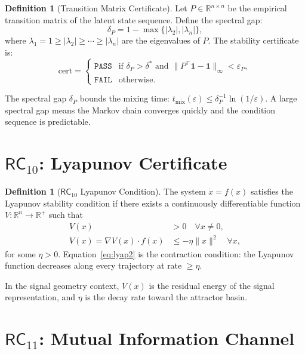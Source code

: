 \documentclass[11pt,twoside]{article}
\theoremstyle{plain}
\theoremstyle{definition}
\newtheorem{definition}[theorem]{Definition}
\theoremstyle{remark}
\newcommand{\RC}[1]{\textsf{RC}_{#1}}
\begin{document}
\begin{definition}[Transition Matrix Certificate]
Let $P\in\mathbb{R}^{n\times n}$ be the empirical transition matrix of the
latent state sequence.  Define the spectral gap:
\begin{equation}
  \delta_P = 1 - \max\{|\lambda_2|,|\lambda_n|\},
\end{equation}
where $\lambda_1=1\ge|\lambda_2|\ge\cdots\ge|\lambda_n|$ are the eigenvalues
of $P$.  The stability certificate is:
\begin{equation}
  \text{cert} =
  \begin{cases}
    \mathtt{PASS} & \text{if } \delta_P > \delta^* \text{ and }
                    \|P^\top \mathbf{1} - \mathbf{1}\|_\infty < \varepsilon_P,\\
    \mathtt{FAIL} & \text{otherwise.}
  \end{cases}
\end{equation}
\end{definition}

The spectral gap $\delta_P$ bounds the mixing time:
$t_{\mathrm{mix}}(\varepsilon)\le \delta_P^{-1}\ln(1/\varepsilon)$.
A large spectral gap means the Markov chain converges quickly and the condition
sequence is predictable.

\section{\texorpdfstring{$\RC{10}$}{RC10}: Lyapunov Certificate}

\begin{definition}[$\RC{10}$ Lyapunov Condition]
The system $\dot{x}=f(x)$ satisfies the Lyapunov stability condition if there
exists a continuously differentiable function $V:\mathbb{R}^n\to\mathbb{R}^+$
such that
\begin{align}
  V(x) &> 0 \quad \forall x\ne 0,\label{eq:lyap1}\\
  \dot{V}(x) = \nabla V(x)\cdot f(x) &\le -\eta\|x\|^2 \quad \forall x,\label{eq:lyap2}
\end{align}
for some $\eta>0$.  Equation~\eqref{eq:lyap2} is the contraction condition:
the Lyapunov function decreases along every trajectory at rate $\ge\eta$.
\end{definition}

In the signal geometry context, $V(x)$ is the residual energy of the signal
representation, and $\eta$ is the decay rate toward the attractor basin.

\section{\texorpdfstring{$\RC{11}$}{RC11}: Mutual Information Channel}
\end{document}
